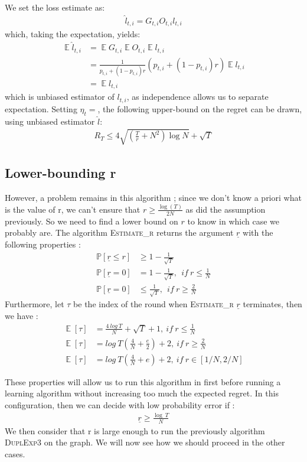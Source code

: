 \documentclass[11pt,a4paper]{article}
\DeclareMathOperator*{\expect}{\mathbb{E}}
\begin{document}
We set the loss estimate as:
\begin{align*}
\hat{l}_{t,i}=G_{t,i}O_{t,i}l_{t,i}
\end{align*}
which, taking the expectation, yields:
\begin{align*}
\expect{\hat{l}_{t,i}}&=\expect{G_{t,i}}\expect{O_{t,i}}\expect{l_{t,i}} \\
&= \frac{1}{p_{t,i}+(1-p_{t,i})r} \left(p_{t,i}+(1-p_{t,i})r\right) \expect{l_{t,i}} \\
&= \expect{l_{t,i}}
\end{align*}
which is unbiased estimator of $l_{t,i}$, as independence allows us to separate expectation. Setting $\eta_t = $, the following upper-bound on the regret can be drawn, using unbiased estimator $\hat l$:
\begin{align*}
R_T \leq 4 \sqrt{\left(\frac{T}{r}+N^2\right)\log N}+\sqrt{T}
\end{align*}
\subsection{Lower-bounding r}
However, a problem remains in this algorithm ; since we don't know a priori what is the value of r, we can't ensure that $ r\geq \frac{\log(T)}{2N}$ as did the assumption previously. So we need to find a lower bound on $r$ to know in which case we probably are. The algorithm \textsc{Estimate\_r} returns the argument $\underline{r}$ with the following properties : 
\begin{align*}
\mathbb{P} [\underline{r}\leq r]&\geq 1-\frac{1}{\sqrt{T}}\\
\mathbb{P} [\underline{r}=0]&=1-\frac{1}{\sqrt{T}},\ \ if\ r\leq \frac{1}{N}\\
\mathbb{P} [\underline{r}=0]&\leq \frac{1}{\sqrt{T}},\ \ if\ r\geq \frac{2}{N}
\end{align*}
Furthermore, let $\tau$ be the index of the round when \textsc{Estimate\_r} $\underline{r}$ terminates, then we have :
\begin{align*}
\expect{[\tau]} & = \frac{4\ log\ T}{N}+\sqrt{T}+1,\ if\ r \leq \frac{1}{N}\\
\expect{[\tau]} & = log\ T \left( \frac{4}{N} + \frac{e}{2} \right) + 2,\ if\ r\geq \frac{2}{N}\\
\expect{[\tau]} & = log\ T \left( \frac{4}{N} + e \right) + 2,\ if\ r \in [1/N,2/N]
\end{align*}

These properties will allow us to run this algorithm in first before running a learning algorithm without increasing too much the expected regret. In this configuration, then we can decide with low probability error if :
\begin{align*}
\underline{r} \geq \frac{\log\ T}{N}
\end{align*}
We then consider that r is large enough to run the previously algorithm \textsc{DuplExp3} on the graph. We will now see how we should proceed in the other cases.
\end{document}
